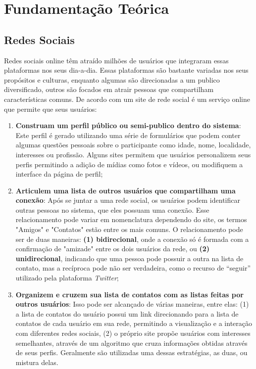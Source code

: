 \chapter{Fundamentação Teórica}

\section{Redes Sociais}

Redes sociais online têm atraído milhões de usuários que integraram essas plataformas nos seus dia-a-dia. Essas plataformas são bastante variadas nos seus propósitos e culturas, enquanto algumas são direcionadas a um publico diversificado, outros são focados em atrair pessoas que compartilham características comuns. De acordo com \cite{boyd_social_2007} um site de rede social é um serviço online que permite que seus usuários:

\begin{enumerate}
    
    \item \textbf{Construam um perfil público ou semi-publico dentro do sistema}: Este perfil é gerado utilizando uma série de formulários que podem conter algumas questões pessoais sobre o participante como idade, nome, localidade, interesses ou profissão. Alguns sites permitem que usuários personalizem seus perfis permitindo a adição de mídias como fotos e vídeos, ou modifiquem a interface da página de perfil;
    
    \item \textbf{Articulem uma lista de outros usuários que compartilham uma conexão}: Após se juntar a uma rede social, os usuários podem identificar outras pessoas no sistema, que eles possuam uma conexão. Esse relacionamento pode variar em nomenclatura dependendo do site, os termos "Amigos" e "Contatos" estão entre os mais comuns. O relacionamento pode ser de duas maneiras: \textbf{(1) bidirecional}, onde a conexão só é formada com a confirmação de "amizade" entre os dois usuários da rede, ou \textbf{(2) unidirecional}, indicando que uma pessoa pode possuir a outra na lista de contato, mas a recíproca pode não ser verdadeira, como o recurso de ``seguir'' utilizado pela plataforma \emph{Twitter};
    
    \item \textbf{Organizem e cruzem sua lista de contatos com as listas feitas por outros usuários}: Isso pode ser alcançado de várias maneiras, entre elas: (1) a lista de contatos do usuário possui um link direcionando para a lista de contatos de cada usuário em sua rede, permitindo a visualização e a interação com diferentes redes sociais, (2) o próprio site propõe usuários com interesses semelhantes, através de um algoritmo que cruza informações obtidas através de seus perfis. Geralmente são utilizadas uma dessas estratégias, as duas, ou mistura delas.
    
\end{enumerate}

